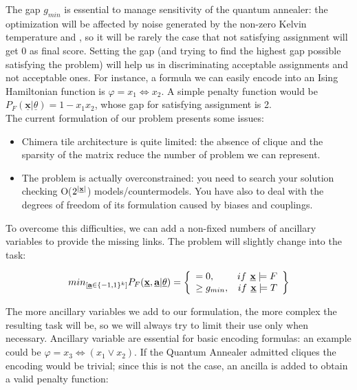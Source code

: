 The gap $g_{min}$ is essential to manage sensitivity of the quantum annealer: the optimization will be affected by noise generated by the non-zero Kelvin temperature and , so it will be rarely the case that not satisfying assignment will get 0 as final score. Setting the gap (and trying to find the highest gap possible satisfying the problem) will help us in discriminating acceptable assignments and not acceptable ones.
For instance, a formula we can easily encode into an Ising Hamiltonian function is $\varphi = x_1 \iff x_2$. A simple penalty function would be $P_F(\underline{\textbf{x}} | \underline{\theta}) = 1 - x_1x_2$, whose gap for satisfying assignment is 2. \\
The current formulation of our problem presents some issues:

\begin{itemize}
    \item Chimera tile architecture is quite limited: the absence of clique and the sparsity of the matrix reduce the number of problem we can represent.
    \item The problem is actually overconstrained: you need to search your solution checking O($2^{|\textbf{\underline{x}}|}$) models/countermodels. You have also to deal with the degrees of freedom of its formulation caused by biases and couplings.
\end{itemize}

To overcome this difficulties, we can add a non-fixed numbers of ancillary variables to provide the missing links. The problem will slightly change into the task:

\begin{equation}
    min_{[\textbf{\underline{a}} \in \{-1,1\}^k]} P_F(\underline{\textbf{x}},\underline{\textbf{a}} | \underline{\theta}) = 
    \left\{
        \begin{array}{lr}
            = 0, & if \textbf{ \underline{x}} \models F \\
            \geq g_{min}, & if \textbf{ \underline{x}} \models T
        \end{array}
    \right\}
\end{equation}

The more ancillary variables we add to our formulation, the more complex the resulting task will be, so we will always try to limit their use only when necessary. Ancillary variable are essential for basic encoding formulas: an example could be $\varphi = x_3 \iff (x_1 \vee x_2)$. If the Quantum Annealer admitted cliques the encoding would be trivial; since this is not the case, an ancilla is added to obtain a valid penalty function:

